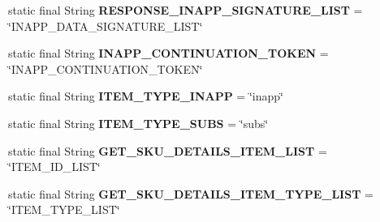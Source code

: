 \begin{DoxyCompactItemize}
\item 
\mbox{\label{classorg_1_1cocos2dx_1_1plugin_1_1util_1_1IabHelper_a848421c1da5f366460640be4f89611f0}} 
static final String {\bfseries R\+E\+S\+P\+O\+N\+S\+E\+\_\+\+I\+N\+A\+P\+P\+\_\+\+S\+I\+G\+N\+A\+T\+U\+R\+E\+\_\+\+L\+I\+ST} = \char`\"{}I\+N\+A\+P\+P\+\_\+\+D\+A\+T\+A\+\_\+\+S\+I\+G\+N\+A\+T\+U\+R\+E\+\_\+\+L\+I\+ST\char`\"{}
\item 
\mbox{\label{classorg_1_1cocos2dx_1_1plugin_1_1util_1_1IabHelper_afc51c3900f2cbc94a280ed233e50b93d}} 
static final String {\bfseries I\+N\+A\+P\+P\+\_\+\+C\+O\+N\+T\+I\+N\+U\+A\+T\+I\+O\+N\+\_\+\+T\+O\+K\+EN} = \char`\"{}I\+N\+A\+P\+P\+\_\+\+C\+O\+N\+T\+I\+N\+U\+A\+T\+I\+O\+N\+\_\+\+T\+O\+K\+EN\char`\"{}
\item 
\mbox{\label{classorg_1_1cocos2dx_1_1plugin_1_1util_1_1IabHelper_af13d19695fa5782f268d859aa7bfe91b}} 
static final String {\bfseries I\+T\+E\+M\+\_\+\+T\+Y\+P\+E\+\_\+\+I\+N\+A\+PP} = \char`\"{}inapp\char`\"{}
\item 
\mbox{\label{classorg_1_1cocos2dx_1_1plugin_1_1util_1_1IabHelper_a381fec9235ace1f630989c7f1a853c26}} 
static final String {\bfseries I\+T\+E\+M\+\_\+\+T\+Y\+P\+E\+\_\+\+S\+U\+BS} = \char`\"{}subs\char`\"{}
\item 
\mbox{\label{classorg_1_1cocos2dx_1_1plugin_1_1util_1_1IabHelper_a1eef76824937843993707208485beafc}} 
static final String {\bfseries G\+E\+T\+\_\+\+S\+K\+U\+\_\+\+D\+E\+T\+A\+I\+L\+S\+\_\+\+I\+T\+E\+M\+\_\+\+L\+I\+ST} = \char`\"{}I\+T\+E\+M\+\_\+\+I\+D\+\_\+\+L\+I\+ST\char`\"{}
\item 
\mbox{\label{classorg_1_1cocos2dx_1_1plugin_1_1util_1_1IabHelper_a04aa5cfc5fafbf5fc11caf67a2cf9b25}} 
static final String {\bfseries G\+E\+T\+\_\+\+S\+K\+U\+\_\+\+D\+E\+T\+A\+I\+L\+S\+\_\+\+I\+T\+E\+M\+\_\+\+T\+Y\+P\+E\+\_\+\+L\+I\+ST} = \char`\"{}I\+T\+E\+M\+\_\+\+T\+Y\+P\+E\+\_\+\+L\+I\+ST\char`\"{}
\end{DoxyCompactItemize}


